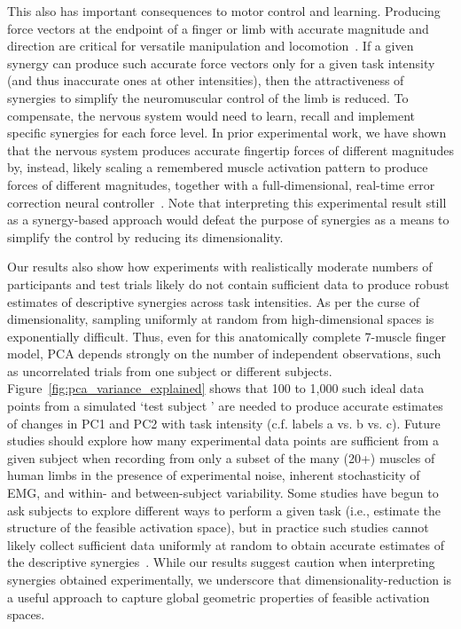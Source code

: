 \documentclass[letterpaper]{article}
\begin{document}
This also has important consequences to motor control and learning. Producing force vectors at the endpoint of a finger or limb with accurate magnitude and direction are critical for versatile manipulation and locomotion~\cite{cole2006age,valero1998large,donelan2004mechanical}. If a given synergy can produce such accurate force vectors only for a given task intensity (and thus inaccurate ones at other intensities), then the attractiveness of synergies to simplify the neuromuscular control of the limb is reduced.
To compensate, the nervous system would need to learn, recall and implement specific synergies for each force level. In prior experimental work, we have shown that the nervous system produces accurate fingertip forces of different magnitudes by, instead, likely scaling a remembered muscle activation pattern to produce forces of different magnitudes, together with a full-dimensional, real-time error correction neural controller~\cite{Valero-Cuevas2000Scaling}. Note that interpreting this experimental result still as a synergy-based approach would defeat the purpose of synergies as a means to simplify the control by reducing its dimensionality.

Our results also show how experiments with realistically moderate numbers of participants and test trials likely do not contain sufficient data to produce robust estimates of descriptive synergies across task intensities. As per the curse of dimensionality, sampling uniformly at random from high-dimensional spaces is exponentially difficult. Thus, even for this anatomically complete 7-muscle finger model, PCA depends strongly on the number of independent observations, such as uncorrelated trials from one subject or different subjects. Figure~\ref{fig:pca_variance_explained} shows that 100 to 1,000 such ideal data points from a simulated `test subject ' are needed to produce accurate estimates of changes in PC1 and PC2 with task intensity (c.f. labels a vs. b vs. c). Future studies should explore how many experimental data points are sufficient from a given subject when recording from only a subset of the many (20+) muscles of human limbs in the presence of experimental noise, inherent stochasticity of EMG, and within- and between-subject variability. Some studies have begun to ask subjects to explore different ways to perform a given task \cite{berger2014effective} (i.e., estimate the structure of the feasible activation space), but in practice such studies cannot likely collect sufficient data uniformly at random to obtain accurate estimates of the descriptive synergies~\cite{kutch2012challenges}. While our results suggest caution when interpreting synergies obtained experimentally, we underscore that dimensionality-reduction is a useful approach to capture global geometric properties of feasible activation spaces.
\end{document}
